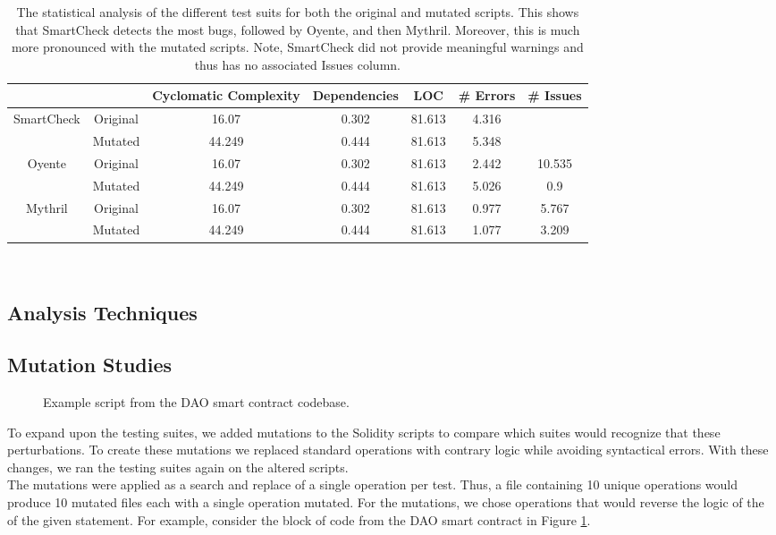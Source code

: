      
\begin{table}[h!]
\centering
\begin{tabular}{|ccccccc|}
\hline
 & & \textbf{Cyclomatic Complexity}	&\textbf{Dependencies}&	LOC	&	\textbf{\# Errors} &	\textbf{\# Issues} \\

\hline
SmartCheck & Original  & 16.07 & 0.302 & 81.613   & 4.316 & \\
        & Mutated  & 44.249 & 0.444 & 81.613   & 5.348 & \\
 Oyente & Original   & 16.07 & 0.302 & 81.613  & 2.442 & 10.535\\
        & Mutated  & 44.249 & 0.444 & 81.613 &  5.026 & 0.9\\
Mythril & Original  & 16.07 & 0.302 & 81.613 &   0.977 & 5.767\\
        & Mutated  & 44.249 & 0.444 & 81.613 &   1.077 & 3.209\\
\hline
\end{tabular}\\
\label{tbl:Statistics}
\caption{ The statistical analysis of the different test suits for both the original and mutated scripts. This shows that SmartCheck detects the most bugs, followed by Oyente, and then Mythril. Moreover, this is much more pronounced with the mutated scripts. Note, SmartCheck did not provide meaningful warnings and thus has no associated Issues column.}
\end{table} 

\subsection{Analysis Techniques}
\subsection*{Mutation Studies}
\begin{figure}[h!]
 
\label{code:proposal}
\caption{Example script from the DAO smart contract codebase.}
\end{figure}
To expand upon the testing suites, we added mutations to the Solidity scripts to compare which suites would recognize that these perturbations. To create these mutations we replaced standard operations with contrary logic while avoiding syntactical errors. With these changes, we ran the testing suites again on the altered scripts. \\

The mutations were applied as a search and replace of a single operation per test. Thus, a file containing 10 unique operations would produce 10 mutated files each with a single operation mutated. For the mutations, we chose operations that would reverse the logic of the of the given statement. For example, consider the block of code from the DAO smart contract in Figure \ref{code:proposal}. \\

